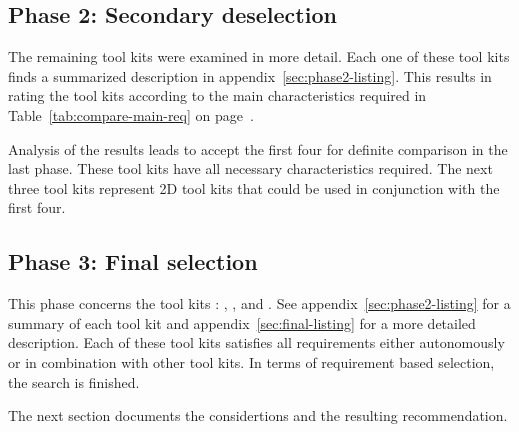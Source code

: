 \subsection{Phase 2: Secondary deselection}

The remaining tool kits were examined in more detail. Each one of these tool
kits finds a summarized description in appendix~\ref{sec:phase2-listing}.  This
results in rating the tool kits according to the main characteristics required
in Table~\ref{tab:compare-main-req} on page~\pageref{tab:compare-main-req}.

Analysis of the results leads to accept the first four for definite 
comparison in the last phase. These tool kits have all necessary
characteristics required. The next three tool kits represent
2D tool kits that could be used in conjunction with the first four.

\subsection{Phase 3: Final selection}

This phase concerns the tool kits : , ,  and
. See appendix~\ref{sec:phase2-listing} for a summary of each tool kit
and appendix~\ref{sec:final-listing} for a more detailed description.  Each of
these tool kits satisfies all requirements either autonomously or in
combination with other tool kits. In terms of requirement based selection, the
search is finished.

The next section documents the considertions and the resulting recommendation.

